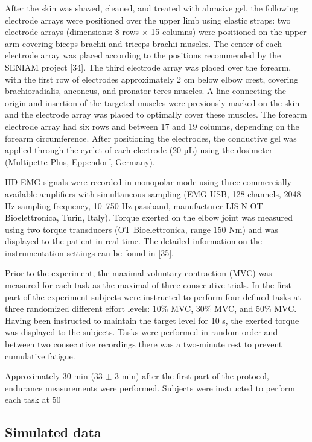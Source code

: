 After the skin was shaved, cleaned, and treated with abrasive gel, the following electrode arrays were positioned over the upper limb using elastic straps: two electrode arrays (dimensions: 8 rows × 15 columns) were positioned on the upper arm covering biceps brachii and triceps brachii muscles. The center of each electrode array was placed according to the positions recommended by the SENIAM project [34]. The third electrode array was placed over the forearm, with the first row of electrodes approximately 2 cm below elbow crest, covering brachioradialis, anconeus, and pronator teres muscles. A line connecting the origin and insertion of the targeted muscles were previously marked on the skin and the electrode array was placed to optimally cover these muscles. The forearm electrode array had six rows and between 17 and 19 columns, depending on the forearm circumference. After positioning the electrodes, the conductive gel was applied through the eyelet of each electrode (20 µL) using the dosimeter (Multipette Plus, Eppendorf, Germany).

HD-EMG signals were recorded in monopolar mode using three commercially available amplifiers with simultaneous sampling (EMG-USB, 128 channels, 2048 Hz sampling frequency, 10–750 Hz passband, manufacturer LISiN-OT Bioelettronica, Turin, Italy). Torque exerted on the elbow joint was measured using two torque transducers (OT Bioelettronica, range 150 Nm) and was displayed to the patient in real time. The detailed information on the instrumentation settings can be found in [35].

Prior to the experiment, the maximal voluntary contraction (MVC) was measured for each task as the maximal of three consecutive trials. In the first part of the experiment subjects were instructed to perform four defined tasks at three randomized different effort levels: 10\% MVC, 30\% MVC, and 50\% MVC. Having been instructed to maintain the target level for 10 s, the exerted torque was displayed to the subjects. Tasks were performed in random order and between two consecutive recordings there was a two-minute rest to prevent cumulative fatigue.

Approximately 30 min (33 $\pm$ 3 min) after the first part of the protocol, endurance measurements were performed. Subjects were instructed to perform each task at 50%

\subsection{Simulated data}

